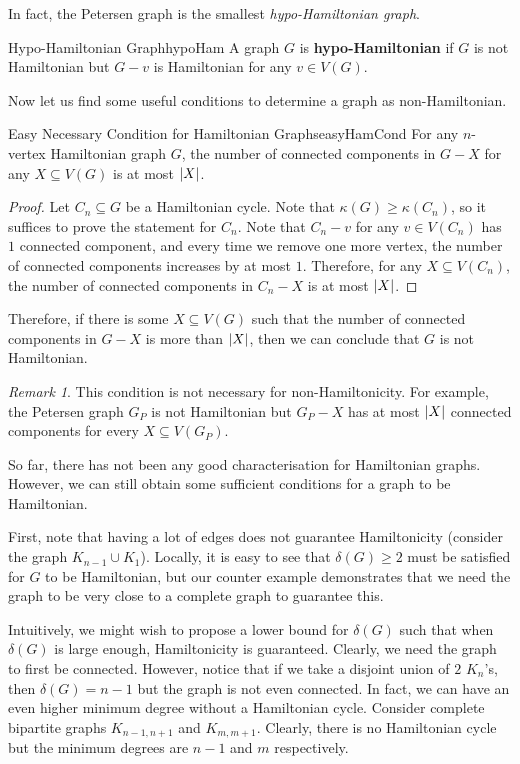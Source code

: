 \documentclass[math, code]{amznotes}
\theoremstyle{remark}
\newtheorem*{remark}{Remark}
\begin{document}
In fact, the Petersen graph is the smallest \textit{hypo-Hamiltonian graph}.
\begin{dfnbox}{Hypo-Hamiltonian Graph}{hypoHam}
    A graph $G$ is {\color{red} \textbf{hypo-Hamiltonian}} if $G$ is not Hamiltonian but $G - v$ is Hamiltonian for any $v \in V(G)$.
\end{dfnbox}
Now let us find some useful conditions to determine a graph as non-Hamiltonian. 
\begin{probox}{Easy Necessary Condition for Hamiltonian Graphs}{easyHamCond}
    For any $n$-vertex Hamiltonian graph $G$, the number of connected components in $G - X$ for any $X \subseteq V(G)$ is at most ${\left\lvert {X} \right\rvert}$.
    \tcblower
    \begin{proof}
        Let $C_n \subseteq G$ be a Hamiltonian cycle. Note that $\kappa(G) \geq \kappa(C_n)$, so it suffices to prove the statement for $C_n$. Note that $C_n - v$ for any $v \in V(C_n)$ has $1$ connected component, and every time we remove one more vertex, the number of connected components increases by at most $1$. Therefore, for any $X \subseteq V(C_n)$, the number of connected components in $C_n - X$ is at most ${\left\lvert {X} \right\rvert}$.
    \end{proof}
\end{probox}
Therefore, if there is some $X \subseteq V(G)$ such that the number of connected components in $G - X$ is more than ${\left\lvert {X} \right\rvert}$, then we can conclude that $G$ is not Hamiltonian. 
\begin{notebox}
    \begin{remark}
        This condition is not necessary for non-Hamiltonicity. For example, the Petersen graph $G_P$ is not Hamiltonian but $G_P - X$ has at most ${\left\lvert {X} \right\rvert}$ connected components for every $X \subseteq V(G_P)$.
    \end{remark}
\end{notebox}
So far, there has not been any good characterisation for Hamiltonian graphs. However, we can still obtain some sufficient conditions for a graph to be Hamiltonian.

First, note that having a lot of edges does not guarantee Hamiltonicity (consider the graph $K_{n - 1} \cup K_1$). Locally, it is easy to see that $\delta(G) \geq 2$ must be satisfied for $G$ to be Hamiltonian, but our counter example demonstrates that we need the graph to be very close to a complete graph to guarantee this.

Intuitively, we might wish to propose a lower bound for $\delta(G)$ such that when $\delta(G)$ is large enough, Hamiltonicity is guaranteed. Clearly, we need the graph to first be connected. However, notice that if we take a disjoint union of $2$ $K_n$'s, then $\delta(G) = n - 1$ but the graph is not even connected. In fact, we can have an even higher minimum degree without a Hamiltonian cycle. Consider complete bipartite graphs $K_{n - 1, n + 1}$ and $K_{m, m + 1}$. Clearly, there is no Hamiltonian cycle but the minimum degrees are $n - 1$ and $m$ respectively.
\end{document}
